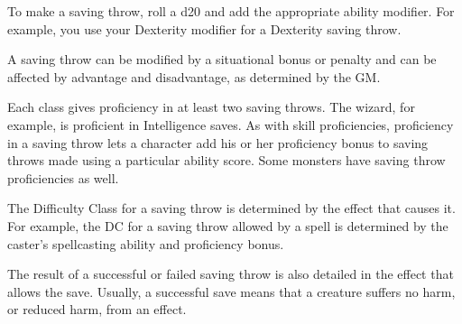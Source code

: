 \documentclass[
]{article}
\begin{document}
To make a saving throw, roll a d20 and add the appropriate ability
modifier. For example, you use your Dexterity modifier for a Dexterity
saving throw.

A saving throw can be modified by a situational bonus or penalty and can
be affected by advantage and disadvantage, as determined by the GM.

Each class gives proficiency in at least two saving throws. The wizard,
for example, is proficient in Intelligence saves. As with skill
proficiencies, proficiency in a saving throw lets a character add his or
her proficiency bonus to saving throws made using a particular ability
score. Some monsters have saving throw proficiencies as well.

The Difficulty Class for a saving throw is determined by the effect that
causes it. For example, the DC for a saving throw allowed by a spell is
determined by the caster's spellcasting ability and proficiency bonus.

The result of a successful or failed saving throw is also detailed in
the effect that allows the save. Usually, a successful save means that a
creature suffers no harm, or reduced harm, from an effect.
\end{document}
